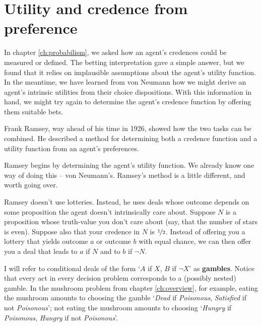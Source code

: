 

\section{Utility and credence from preference}\label{sec:savage}

In chapter \ref{ch:probabilism}, we asked how an agent's credences could be
measured or defined. The betting interpretation gave a simple answer, but we
found that it relies on implausible assumptions about the agent's utility
function. In the meantime, we have learned from von Neumann how we might derive
an agent's intrinsic utilities from their choice dispositions. With this
information in hand, we might try again to determine the agent's credence
function by offering them suitable bets.

Frank Ramsey, way ahead of his time in 1926, showed how the two tasks can be
combined. He described a method for determining both a credence function and a
utility function from an agent's preferences.

Ramsey begins by determining the agent's utility function. We already know one
way of doing this -- von Neumann's. Ramsey's method is a little different, and
worth going over.

Ramsey doesn't use lotteries. Instead, he uses deals whose outcome depends on
some proposition the agent doesn't intrinsically care about. Suppose $N$ is a
proposition whose truth-value you don't care about (say, that the number of
stars is even). Suppose also that your credence in $N$ is $\nicefrac{1}{2}$.
Instead of offering you a lottery that yields outcome $a$ or outcome $b$ with
equal chance, we can then offer you a deal that leads to $a$ if $N$ and to $b$
if $\neg N$.

I will refer to conditional deals of the form `$A$ if $X$, $B$ if $\neg X$' as
\textbf{gambles}. Notice that every act in every decision problem corresponds to
a (possibly nested) gamble. In the mushroom problem from chapter
\ref{ch:overview}, for example, eating the mushroom amounts to choosing the
gamble `\emph{Dead} if \emph{Poisonous}, \emph{Satisfied} if not
\emph{Poisonous}'; not eating the mushroom amounts to choosing `\emph{Hungry} if
\emph{Poisonous}, \emph{Hungry} if not \emph{Poisonous}'.

